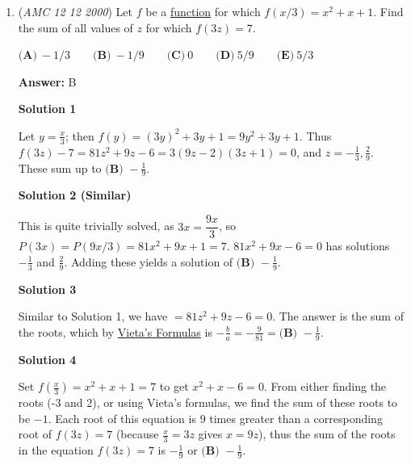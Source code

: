 \begin{enumerate}
 The question asks for the sum of all solutions for $x$, so the answer is $3 + 17 = \boxed{20\ \mathrm{(E)}}$.~Particle Physics

 


	\item (\textit{AMC 12 12 2000}) Let $f$ be a \href{https://artofproblemsolving.com/wiki/index.php?title=Function}{function} for which $f(x/3) = x^2 + x + 1$. Find the sum of all values of $z$ for which $f(3z) = 7$.


 $\textbf {(A)}\ -1/3 \qquad \textbf {(B)}\ -1/9 \qquad \textbf {(C)}\ 0 \qquad \textbf {(D)}\ 5/9 \qquad \textbf {(E)}\ 5/3$

 \textbf{Answer: }B



\textbf{Solution 1}

Let $y = \frac{x}{3}$; then $f(y) = (3y)^2 + 3y + 1 = 9y^2 + 3y+1$. Thus $f(3z)-7=81z^2+9z-6=3(9z-2)(3z+1)=0$, and $z = -\frac{1}{3}, \frac{2}{9}$. These sum up to $\boxed{\textbf{(B) }-\frac19}$.

 



\textbf{Solution 2 (Similar)}

This is quite trivially solved, as $3x = \dfrac{9x}{3}$, so $P(3x) = P(9x/3) = 81x^2 + 9x + 1 = 7$. $81x^2+9x-6 = 0$ has solutions $-\frac{1}{3}$ and $\frac{2}{9}$. Adding these yields a solution of $\boxed{\textbf{(B) }-\frac19}$.

 



\textbf{Solution 3}

Similar to Solution 1, we have $=81z^2+9z-6=0.$ The answer is the sum of the roots, which by \href{https://artofproblemsolving.com/wiki/index.php?title=Vieta\%27s\_Formulas}{Vieta's Formulas} is  $-\frac{b}{a}=-\frac{9}{81}=\boxed{\textbf{(B) }-\frac19}$.

 



\textbf{Solution 4}

Set $f\left(\frac{x}{3} \right) = x^2+x+1=7$ to get $x^2+x-6=0.$ From either finding the roots (-3 and 2), or using Vieta's formulas, we find the sum of these roots to be $-1.$ Each root of this equation is $9$ times greater than a corresponding root of $f(3z) = 7$ (because $\frac{x}{3} = 3z$ gives $x = 9z$), thus the sum of the roots in the equation $f(3z)=7$ is $-\frac{1}{9}$ or $\boxed{\textbf{(B) }-\frac19}$.

 




\end{enumerate}
